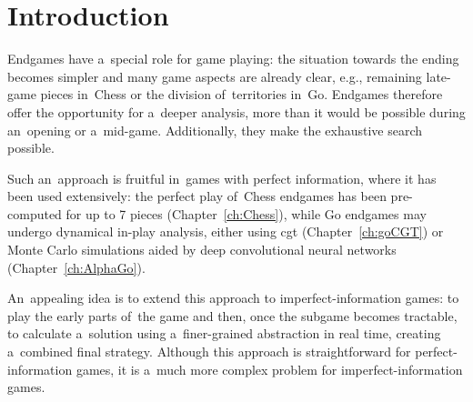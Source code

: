 \chapter*{Introduction}
Endgames have a~special role for game playing:
the situation towards the ending becomes simpler and many game aspects are already clear, e.g., remaining late-game pieces in~Chess or the division of~territories in~Go.
Endgames therefore offer the opportunity for a~deeper analysis, more than it would be possible during an~opening or a~mid-game.
Additionally, they make the exhaustive search possible.

Such an~approach is fruitful in~games with perfect information, where it has been used extensively:
the perfect play of~Chess endgames has been pre-computed for up to 7 pieces (Chapter~\ref{ch:Chess}), while Go endgames may undergo dynamical in-play analysis, either using \acrlong{cgt} (Chapter~\ref{ch:goCGT}) or Monte Carlo simulations aided by deep convolutional neural networks (Chapter~\ref{ch:AlphaGo}).

An~appealing idea is to extend this approach to imperfect-information games:
to play the early parts of~the game and then, once the subgame becomes tractable, to calculate a~solution using a~finer-grained abstraction in real time, creating a~combined final strategy.
Although this approach is straightforward for perfect-information games, it is a~much more complex problem for imperfect-information games. 
